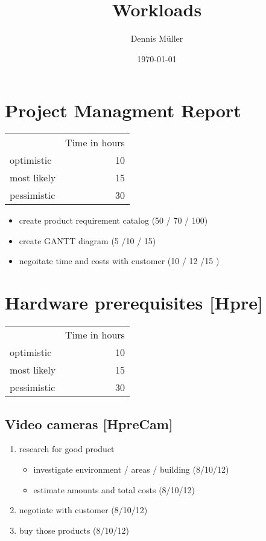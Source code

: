 \documentclass
[
 12pt, %
       DIV12,
       a4paper, %
       oneside, %
       titlepage, %
       parskip=half, %
       headings=normal, %
       listof=totoc, %
       bibliography=totoc, %
       index=totoc, %
       captions=tableheading, %
       ]{scrreprt}
\author{Dennis Müller}
\date{\today}
\title{Workloads}
\begin{document}
\maketitle
\tableofcontents



\chapter{Project Managment Report}
\label{sec:orgd96ec13}
\begin{center}
\begin{tabular}{lr}
 & Time in hours\\
optimistic & 10\\
most likely & 15\\
pessimistic & 30\\
\end{tabular}
\end{center}
\begin{itemize}
\item create product requirement catalog (50 / 70 / 100)
\item create GANTT diagram (5 /10 / 15)
\item negoitate time and costs with customer (10 / 12 /15 )
\end{itemize}

\chapter{Hardware prerequisites [Hpre]}
\label{sec:orgfb33f5b}

\begin{center}
\begin{tabular}{lr}
 & Time in hours\\
optimistic & 10\\
most likely & 15\\
pessimistic & 30\\
\end{tabular}
\end{center}


\section{Video cameras [HpreCam]}
\label{sec:org3a27049}
\begin{enumerate}
\item research for good product
\begin{itemize}
\item investigate environment / areas / building (8/10/12)
\item estimate amounts and total costs (8/10/12)
\end{itemize}
\item negotiate with customer (8/10/12)
\item buy those products (8/10/12)
\end{enumerate}
\end{document}
